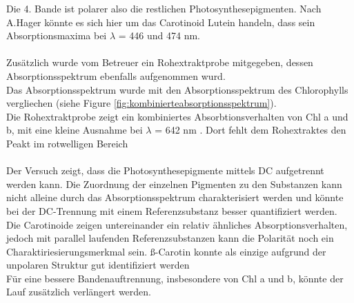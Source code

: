 \documentclass[10pt,a4paper]{article}
\begin{document}
			Die 4. Bande ist polarer also die restlichen Photosynthesepigmenten.  Nach A.Hager könnte es sich hier um das Carotinoid Lutein handeln, dass sein Absorptionsmaxima bei $\lambda$ = 446 und 474\cite{Absorption_Maxima_Carotinoide} nm. \\
			\\
			Zusätzlich wurde vom Betreuer ein Rohextraktprobe mitgegeben, dessen Absorptionsspektrum ebenfalls aufgenommen wurd.\\
			Das Absorptionsspektrum wurde mit den Absorptionsspektrum des Chlorophylls vergliechen (siehe Figure \ref{fig:kombinierteabsorptionsspektrum}).\\
			Die Rohextraktprobe zeigt ein kombiniertes Absorbtionsverhalten von Chl a und b, mit eine kleine Ausnahme bei  $\lambda$ = 642 nm . Dort fehlt dem Rohextraktes den Peakt im rotwelligen Bereich\\
			\\
			Der Versuch zeigt, dass die Photosynthesepigmente mittels DC aufgetrennt werden kann. Die Zuordnung der einzelnen Pigmenten zu den Substanzen kann nicht alleine durch das Absorptionsspektrum charakterisiert werden und könnte bei der DC-Trennung mit einem Referenzsubstanz besser quantifiziert werden. Die Carotinoide zeigen untereinander ein relativ ähnliches Absorptionsverhalten, jedoch mit parallel laufenden Referenzsubstanzen kann die Polarität noch ein Charaktiriesierungsmerkmal sein. ß-Carotin konnte als einzige aufgrund der unpolaren Struktur gut identifiziert werden\\
			Für eine bessere Bandenauftrennung, insbesondere von Chl a und b, könnte der Lauf zusätzlich verlängert werden.\\
			\\
		
\end{document}

